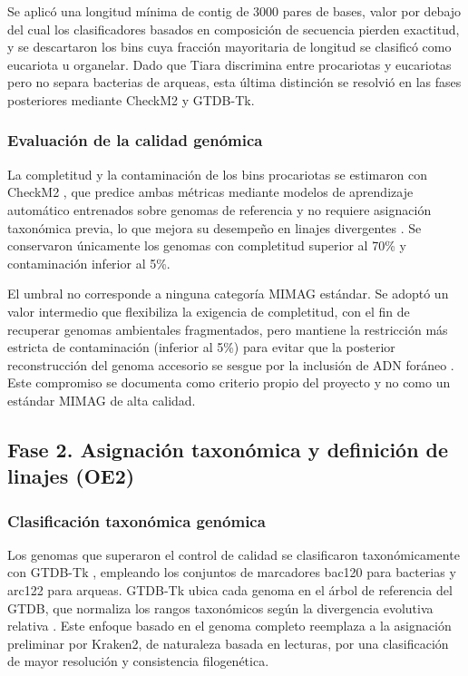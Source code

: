Se aplicó una longitud mínima de contig de 3000 pares de bases, valor por debajo del cual los clasificadores basados en composición de secuencia pierden exactitud, y se descartaron los bins cuya fracción mayoritaria de longitud se clasificó como eucariota u organelar. Dado que Tiara discrimina entre procariotas y eucariotas pero no separa bacterias de arqueas, esta última distinción se resolvió en las fases posteriores mediante CheckM2 y GTDB-Tk.


\subsubsection{Evaluación de la calidad genómica}

La completitud y la contaminación de los bins procariotas se estimaron con CheckM2 \cite{checkm2}, que predice ambas métricas mediante modelos de aprendizaje automático entrenados sobre genomas de referencia y no requiere asignación taxonómica previa, lo que mejora su desempeño en linajes divergentes \cite{checkm2}. Se conservaron únicamente los genomas con completitud superior al 70\% y contaminación inferior al 5\%.

El umbral no corresponde a ninguna categoría MIMAG estándar. Se adoptó un valor intermedio que flexibiliza la exigencia de completitud, con el fin de recuperar genomas ambientales fragmentados, pero mantiene la restricción más estricta de contaminación (inferior al 5\%) para evitar que la posterior reconstrucción del genoma accesorio se sesgue por la inclusión de ADN foráneo \cite{bowers2017}. Este compromiso se documenta como criterio propio del proyecto y no como un estándar MIMAG de alta calidad.

\subsection{Fase 2. Asignación taxonómica y definición de linajes (OE2)}

\subsubsection{Clasificación taxonómica genómica}

Los genomas que superaron el control de calidad se clasificaron taxonómicamente con GTDB-Tk \cite{gtdbtk2019}, empleando los conjuntos de marcadores bac120 para bacterias y arc122 para arqueas. GTDB-Tk ubica cada genoma en el árbol de referencia del GTDB, que normaliza los rangos taxonómicos según la divergencia evolutiva relativa \cite{gtdbtk2019, gtdb2022}. Este enfoque basado en el genoma completo reemplaza a la asignación preliminar por Kraken2, de naturaleza basada en lecturas, por una clasificación de mayor resolución y consistencia filogenética.

